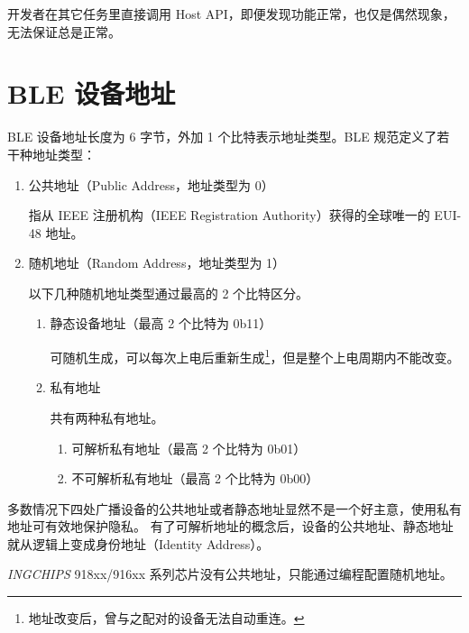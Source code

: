 \documentclass[
  12pt,
]{book}
\makeatletter
\newenvironment{kframe}{%
\medskip{}
\setlength{\fboxsep}{.8em}
 \def\at@end@of@kframe{}%
 \ifinner\ifhmode%
  \def\at@end@of@kframe{\end{minipage}}%
  \begin{minipage}{\columnwidth}%
 \fi\fi%
 \def\FrameCommand##1{\hskip\@totalleftmargin \hskip-\fboxsep
 \colorbox{shadecolor}{##1}\hskip-\fboxsep
     \hskip-\linewidth \hskip-\@totalleftmargin \hskip\columnwidth}%
 \MakeFramed {\advance\hsize-\width
   \@totalleftmargin\z@ \linewidth\hsize
   \@setminipage}}%
 {\par\unskip\endMakeFramed%
 \at@end@of@kframe}
\newenvironment{rmdblock}[1]
  {
  \begin{itemize}
  \renewcommand{\labelitemi}{
    \raisebox{-.7\height}[0pt][0pt]{
      {\setkeys{Gin}{width=3em,keepaspectratio}\texttt{[image: images/\#1]}}
    }
  }
  \setlength{\fboxsep}{1em}
  \begin{kframe}
  \item
  }
  {
  \end{kframe}
  \end{itemize}
  }
\newenvironment{rmdcaution}
  {\begin{rmdblock}{caution}}
  {\end{rmdblock}}
\makeatother
\begin{document}
\begin{rmdcaution}
开发者在其它任务里直接调用 Host
API，即便发现功能正常，也仅是偶然现象，无法保证总是正常。
\end{rmdcaution}

\hypertarget{ch-overview-ble-addr}{%
\section{BLE 设备地址}\label{ch-overview-ble-addr}}

BLE 设备地址长度为 6 字节，外加 1 个比特表示地址类型。BLE 规范定义了若干种地址类型：

\begin{enumerate}
\def\labelenumi{\arabic{enumi}.}
\item
  公共地址（Public Address，地址类型为 0）

  指从 IEEE 注册机构（IEEE Registration Authority）获得的全球唯一的 EUI-48 地址。
\item
  随机地址（Random Address，地址类型为 1）

  以下几种随机地址类型通过最高的 2 个比特区分。

  \begin{enumerate}
  \def\labelenumii{\arabic{enumii}.}
  \item
    静态设备地址（最高 2 个比特为 0b11）

    可随机生成，可以每次上电后重新生成\footnote{地址改变后，曾与之配对的设备无法自动重连。}，但是整个上电周期内不能改变。
  \item
    私有地址

    共有两种私有地址。

    \begin{enumerate}
    \def\labelenumiii{\arabic{enumiii}.}
    \item
      可解析私有地址（最高 2 个比特为 0b01）
    \item
      不可解析私有地址（最高 2 个比特为 0b00）
    \end{enumerate}
  \end{enumerate}
\end{enumerate}

多数情况下四处广播设备的公共地址或者静态地址显然不是一个好主意，使用私有地址可有效地保护隐私。
有了可解析地址的概念后，设备的公共地址、静态地址就从逻辑上变成身份地址（Identity Address）。

\begin{rmdcaution}
\emph{INGCHIPS} 918xx/916xx
系列芯片没有公共地址，只能通过编程配置随机地址。
\end{rmdcaution}
\end{document}
